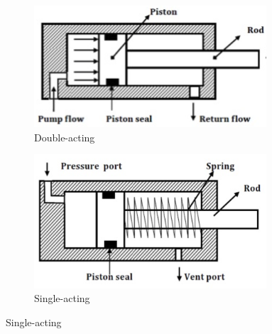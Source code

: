 \documentclass[10pt,letterpaper]{book}
\begin{document}
\begin{figure}[H]
	\begin{subfigure}[b]{.45\linewidth}
		\includegraphics[width=0.95\textwidth]{imgs/piston_doubleact.png}
		\caption{Double-acting}
	\end{subfigure}
	\begin{subfigure}[b]{.45\linewidth}
		\includegraphics[width=0.95\textwidth]{imgs/piston_singleact.png}
		\caption{Single-acting}
	\end{subfigure}
	

\end{figure}
\end{document}
